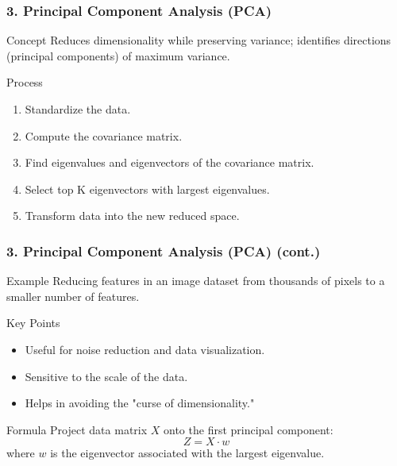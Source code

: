 \documentclass[aspectratio=169]{beamer}
\begin{document}
\begin{frame}[fragile]
    \frametitle{3. Principal Component Analysis (PCA)}
    \begin{block}{Concept}
        Reduces dimensionality while preserving variance; identifies directions (principal components) of maximum variance.
    \end{block}
    \begin{block}{Process}
        \begin{enumerate}
            \item Standardize the data.
            \item Compute the covariance matrix.
            \item Find eigenvalues and eigenvectors of the covariance matrix.
            \item Select top K eigenvectors with largest eigenvalues.
            \item Transform data into the new reduced space.
        \end{enumerate}
    \end{block}
\end{frame}

\begin{frame}[fragile]
    \frametitle{3. Principal Component Analysis (PCA) (cont.)}
    \begin{block}{Example}
        Reducing features in an image dataset from thousands of pixels to a smaller number of features.
    \end{block}
    \begin{block}{Key Points}
        \begin{itemize}
            \item Useful for noise reduction and data visualization.
            \item Sensitive to the scale of the data.
            \item Helps in avoiding the "curse of dimensionality."
        \end{itemize}
    \end{block}
    \begin{block}{Formula}
        Project data matrix \( X \) onto the first principal component:
        \begin{equation}
        Z = X \cdot w
        \end{equation}
        where \( w \) is the eigenvector associated with the largest eigenvalue.
    \end{block}
\end{frame}
\end{document}
